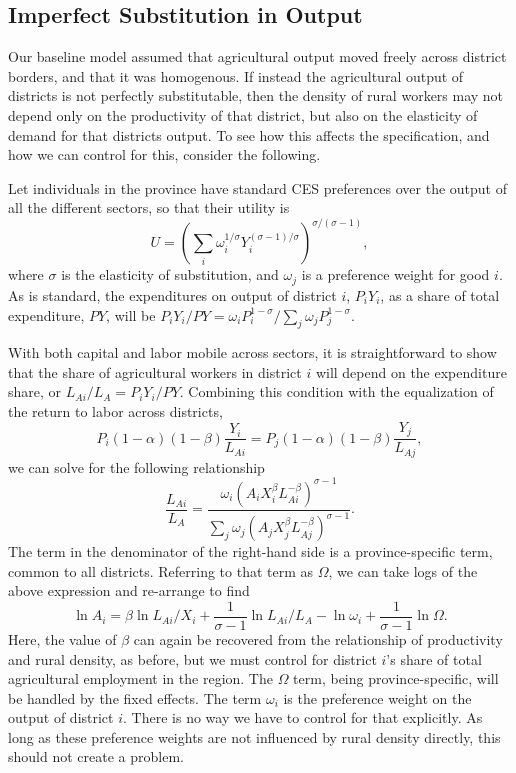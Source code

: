 \documentclass[11pt]{article}
\begin{document}
\subsection{Imperfect Substitution in Output}
Our baseline model assumed that agricultural output moved freely across district borders, and that it was homogenous. If instead the agricultural output of districts is not perfectly substitutable, then the density of rural workers may not depend only on the productivity of that district, but also on the elasticity of demand for that districts output. To see how this affects the specification, and how we can control for this, consider the following.

Let individuals in the province have standard CES preferences over the output of all the different sectors, so that their utility is 
\begin{equation}
U = \left(\sum_i \omega_i^{1/\sigma}Y_i^{(\sigma-1)/\sigma}\right)^{\sigma/(\sigma-1)},
\end{equation}
where $\sigma$ is the elasticity of substitution, and $\omega_j$ is a preference weight for good $i$. As is standard, the expenditures on output of district $i$, $P_i Y_i$, as a share of total expenditure, $PY$, will be $P_iY_i/PY =  \omega_iP_i^{1-\sigma}/\sum_j \omega_jP_j^{1-\sigma}$. 

With both capital and labor mobile across sectors, it is straightforward to show that the share of agricultural workers in district $i$ will depend on the expenditure share, or $L_{Ai}/L_A = P_iY_i/PY$. Combining this condition with the equalization of the return to labor across districts,
\begin{equation}
	P_i (1-\alpha)(1-\beta)\frac{Y_{i}}{L_{Ai}} = P_j (1-\alpha)(1-\beta)\frac{Y_{j}}{L_{Aj}},
\end{equation}
we can solve for the following relationship
\begin{equation}
	\frac{L_{Ai}}{L_A} = \frac{\omega_i \left(A_i X_i^{\beta} L_{Ai}^{-\beta}\right)^{\sigma-1}}{\sum_j \omega_j \left(A_j X_j^{\beta} L_{Aj}^{-\beta}\right)^{\sigma-1}}.
\end{equation}
The term in the denominator of the right-hand side is a province-specific term, common to all districts. Referring to that term as $\Omega$, we can take logs of the above expression and re-arrange to find
\begin{equation}
	\ln A_i = \beta \ln L_{Ai}/X_i + \frac{1}{\sigma-1} \ln L_{Ai}/L_A - \ln \omega_i + \frac{1}{\sigma-1} \ln \Omega.
\end{equation}
Here, the value of $\beta$ can again be recovered from the relationship of productivity and rural density, as before, but we must control for district $i$'s share of total agricultural employment in the region. The $\Omega$ term, being province-specific, will be handled by the fixed effects. The term $\omega_i$ is the preference weight on the output of district $i$. There is no way we have to control for that explicitly. As long as these preference weights are not influenced by rural density directly, this should not create a problem. 
\end{document}
